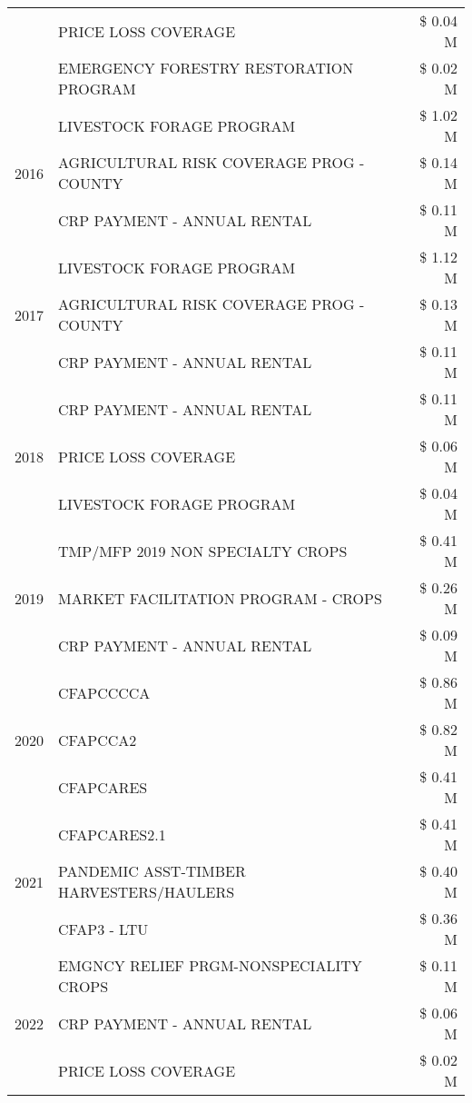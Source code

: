 \begin{tabular}{llr}
 & PRICE LOSS COVERAGE & \$ 0.04 M \\
 & EMERGENCY FORESTRY RESTORATION PROGRAM & \$ 0.02 M \\
\cline{1-3}
\multirow[t]{3}{*}{2016} & LIVESTOCK FORAGE PROGRAM & \$ 1.02 M \\
 & AGRICULTURAL RISK COVERAGE PROG - COUNTY & \$ 0.14 M \\
 & CRP PAYMENT - ANNUAL RENTAL & \$ 0.11 M \\
\cline{1-3}
\multirow[t]{3}{*}{2017} & LIVESTOCK FORAGE PROGRAM & \$ 1.12 M \\
 & AGRICULTURAL RISK COVERAGE PROG - COUNTY & \$ 0.13 M \\
 & CRP PAYMENT - ANNUAL RENTAL & \$ 0.11 M \\
\cline{1-3}
\multirow[t]{3}{*}{2018} & CRP PAYMENT - ANNUAL RENTAL & \$ 0.11 M \\
 & PRICE LOSS COVERAGE & \$ 0.06 M \\
 & LIVESTOCK FORAGE PROGRAM & \$ 0.04 M \\
\cline{1-3}
\multirow[t]{3}{*}{2019} & TMP/MFP 2019 NON SPECIALTY CROPS & \$ 0.41 M \\
 & MARKET FACILITATION PROGRAM - CROPS & \$ 0.26 M \\
 & CRP PAYMENT - ANNUAL RENTAL & \$ 0.09 M \\
\cline{1-3}
\multirow[t]{3}{*}{2020} & CFAPCCCCA & \$ 0.86 M \\
 & CFAPCCA2 & \$ 0.82 M \\
 & CFAPCARES & \$ 0.41 M \\
\cline{1-3}
\multirow[t]{3}{*}{2021} & CFAPCARES2.1 & \$ 0.41 M \\
 & PANDEMIC ASST-TIMBER HARVESTERS/HAULERS & \$ 0.40 M \\
 & CFAP3 - LTU & \$ 0.36 M \\
\cline{1-3}
\multirow[t]{3}{*}{2022} & EMGNCY RELIEF PRGM-NONSPECIALITY CROPS & \$ 0.11 M \\
 & CRP PAYMENT - ANNUAL RENTAL & \$ 0.06 M \\
 & PRICE LOSS COVERAGE & \$ 0.02 M \\
\cline{1-3}
\bottomrule
\end{tabular}

